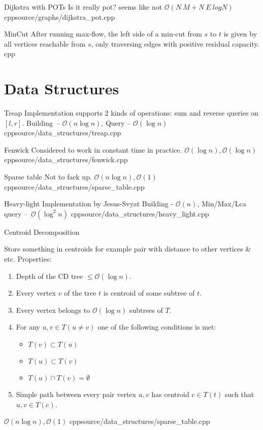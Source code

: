 \documentclass[landscape, 10pt, a4paper, oneside, twocolumn]{extarticle}
\begin{document}
\Algorithm
{Dijkstra with POTs}
{Is it really pot? seems like not}
{$\mathcal{O}(N\ M + N\ E\ logN)$}
{cpp}{source/graphs/dijkstra_pot.cpp}

\Algorithm
{MinCut}
{After running max-flow, the left side of a min-cut from $s$ to $t$ is given by all vertices reachable from $s$, only traversing edges with positive residual capacity.}
{}
{cpp}{}




\section{Data Structures}

\Algorithm
{Treap}
{Implementation supports 2 kinds of operations: sum and reverse queries on $[l, r]$.}
{Building – $\mathcal{O}(n \log n)$, Query – $\mathcal{O}(\log n)$}
{cpp}{source/data_structures/treap.cpp}

\Algorithm
{Fenwick}
{Considered to work in constant time in practice.}
{$\mathcal{O}(\log n), \mathcal{O}(\log n)$}
{cpp}{source/data_structures/fenwick.cpp}

\Algorithm
{Sparse table}
{Not to fack up.}
{$\mathcal{O}(n \log n), \mathcal{O}(1)$}
{cpp}{source/data_structures/sparse_table.cpp}

\Algorithm
{Heavy-light}
{Implementation by Jesus-Svyat}
{Building - $\mathcal{O}(n)$, Min/Max/Lca query – $\mathcal{O}(\log^2 n)$}
{cpp}{source/data_structures/heavy_light.cpp}

\Algorithm
{Centroid Decomposition}
{Store something in centroids for example pair with distance to other vertices & etc.
Properties:
    \begin{enumerate}
        \item Depth of the CD tree $ \leq \mathcal{O}(\log n)$.
        \item Every vertex $v$ of the tree $t$ is centroid of some subtree of $t$.
        \item Every vertex belongs to $\mathcal{O}(\log n)$ subtrees of $T$.
        \item For any $u, v \in T (u \neq v)$ one of the following conditions is met:
            \begin{itemize}
                \item $T(v) \subset T(u)$
                \item $T(u) \subset T(v)$
                \item $T(u) \cap T(v) = \emptyset $
            \end{itemize}
        \item Simple path between every pair vertex $u, v$ has centroid $c \in T(t)$ such that $u, v \in T(c)$. 
    \end{enumerate}
}
{$\mathcal{O}(n \log n), \mathcal{O}(1)$}
{cpp}{source/data_structures/sparse_table.cpp}
\end{document}
